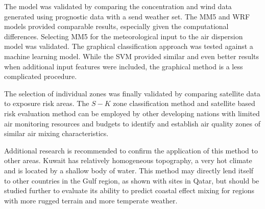 The model was validated by comparing the concentration and wind data generated using prognostic data with a send weather set. The MM5 and WRF models provided comparable results, especially given the computational differences. Selecting MM5 for the meteorological input to the air dispersion model was validated. The graphical classification approach was tested against a machine learning model. While the SVM provided similar and even better results when additional input features were included, the graphical method is a less complicated procedure.

The selection of individual zones was finally validated by comparing satellite data to exposure risk areas.  The $S-K$ zone classification method and satellite based risk evaluation method can be employed by other developing nations with limited air monitoring resources and budgets to identify and establish air quality zones of similar air mixing characteristics.

Additional research is recommended to confirm the application of this method to other areas.  Kuwait has relatively homogeneous topography, a very hot climate and is located by a shallow body of water.  This method may directly lend itself to other countries in the Gulf region, as shown with sites in Qatar, but should be studied further to evaluate its ability to predict coastal effect mixing for regions with more rugged terrain and more temperate weather.








